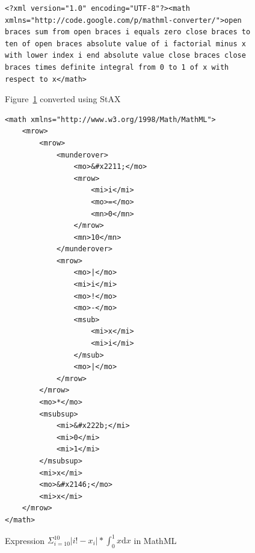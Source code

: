 \documentclass[11pt,oneside,final]{fithesis2}
\begin{document}
\begin{figure}[!ht]
\lstset{language=XML,frame=lines}
\begin{lstlisting}
<?xml version="1.0" encoding="UTF-8"?><math xmlns="http://code.google.com/p/mathml-converter/">open braces sum from open braces i equals zero close braces to ten of open braces absolute value of i factorial minus x with lower index i end absolute value close braces close braces times definite integral from 0 to 1 of x with respect to x</math>
\end{lstlisting}
\caption{Figure~\ref{appendix:xml:example2} converted using StAX}
\end{figure}

\begin{figure}[!ht]
\lstset{language=XML,frame=lines}
\begin{lstlisting}
<math xmlns="http://www.w3.org/1998/Math/MathML">
	<mrow>
		<mrow>
			<munderover>
				<mo>&#x2211;</mo>
				<mrow>
					<mi>i</mi>
					<mo>=</mo>
					<mn>0</mn>
				</mrow>
				<mn>10</mn>
			</munderover>
			<mrow>
				<mo>|</mo>
				<mi>i</mi>
				<mo>!</mo>
				<mo>-</mo>
				<msub>
					<mi>x</mi>
					<mi>i</mi>
				</msub>
				<mo>|</mo>
			</mrow>
		</mrow>
		<mo>*</mo>
		<msubsup>
			<mi>&#x222b;</mi>
			<mi>0</mi>
			<mi>1</mi>
		</msubsup>
		<mi>x</mi>
		<mo>&#x2146;</mo>
		<mi>x</mi>
	</mrow>
</math>
\end{lstlisting}
\caption{Expression $\Sigma_{i=10}^{10}|i!-x_i|*\int_0^1 x \mathrm{d} x$ in MathML}
\label{appendix:xml:example2}
\end{figure}
\end{document}
